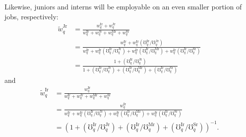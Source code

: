 \documentclass[hidelinks, nonatbib]{elsarticle}
\begin{document}
\begin{enumerate}
    Likewise, juniors and interns will be employable on an even smaller portion of jobs, respectively:
    \begin{align}
        \tilde{w}_{q}^{\text{Jr}} 
        &= 
        \frac{
            w_{q}^{\text{Ir}} +
            w_{q}^{\text{Jr}}
        }{
            w_{q}^{\text{Ir}} +
            w_{q}^{\text{Jr}} +
            w_{q}^{\text{Mr}} +
            w_{q}^{\text{Sr}}
        }
        \\
        &= 
        \frac{
            w_{q}^{\text{Ir}} +
            w_{q}^{\text{Ir}} 
             (
                \mho_{q}^{\text{Ir}} / 
                \mho_{q}^{\text{Jr}}
            )
        }{
            w_{q}^{\text{Ir}} +
            w_{q}^{\text{Ir}} 
             (
                \mho_{q}^{\text{Ir}} / 
                \mho_{q}^{\text{Jr}}
            ) +
            w_{q}^{\text{Ir}} 
             (
                \mho_{q}^{\text{Ir}} / 
                \mho_{q}^{\text{Mr}}
            ) +
            w_{q}^{\text{Ir}} 
             (
                \mho_{q}^{\text{Ir}} / 
                \mho_{q}^{\text{Sr}}
            )
        }
        \\
        &= 
        \frac{
            1 +
            (
                \mho_{q}^{\text{Ir}} / 
                \mho_{q}^{\text{Jr}}
            )
        }{
            1 +
            (
                \mho_{q}^{\text{Ir}} / 
                \mho_{q}^{\text{Jr}}
            ) +
            (
                \mho_{q}^{\text{Ir}} / 
                \mho_{q}^{\text{Mr}}
            ) +
            (
                \mho_{q}^{\text{Ir}} / 
                \mho_{q}^{\text{Sr}}
            )
        }
    \end{align}
    and
    \begin{align}
        \tilde{w}_{q}^{\text{Ir}} 
        &= 
        \frac{
            w_{q}^{\text{Ir}}
        }{
            w_{q}^{\text{Ir}} +
            w_{q}^{\text{Jr}} +
            w_{q}^{\text{Mr}} +
            w_{q}^{\text{Sr}}
        }
        \\
        &= 
        \frac{
            w_{q}^{\text{Ir}}
        }{
            w_{q}^{\text{Ir}} +
            w_{q}^{\text{Ir}} 
             (
                \mho_{q}^{\text{Ir}} / 
                \mho_{q}^{\text{Jr}}
            ) +
            w_{q}^{\text{Ir}} 
             (
                \mho_{q}^{\text{Ir}} / 
                \mho_{q}^{\text{Mr}}
            ) +
            w_{q}^{\text{Ir}} 
             (
                \mho_{q}^{\text{Ir}} / 
                \mho_{q}^{\text{Sr}}
            )
        }
        \\
        &= 
        \left(
            1 +
            (
                \mho_{q}^{\text{Ir}} / 
                \mho_{q}^{\text{Jr}}
            ) +
            (
                \mho_{q}^{\text{Ir}} / 
                \mho_{q}^{\text{Mr}}
            ) +
            (
                \mho_{q}^{\text{Ir}} / 
                \mho_{q}^{\text{Sr}}
            )
        \right) ^ {-1}
        .
    \end{align}


\end{enumerate}
\end{document}
